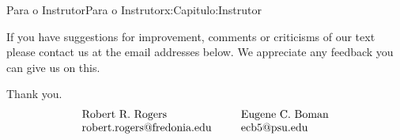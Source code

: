 \begin{chapterptx}{Para o Instrutor}{}{Para o Instrutor}{}{}{x:Capitulo:Instrutor}
	\par
	If you have suggestions for improvement, comments or criticisms of our text please contact us at the email addresses below. We appreciate any feedback you can give us on this.%
	\par
	Thank you.%
	\begin{equation*}
		\begin{array}{lcl} \text{ Robert R. Rogers } & &  \text{ Eugene C. Boman } \\ \text{ robert.rogers@fredonia.edu }  & &  \text{ ecb5@psu.edu } \end{array}
	\end{equation*}
\end{chapterptx}
%
%